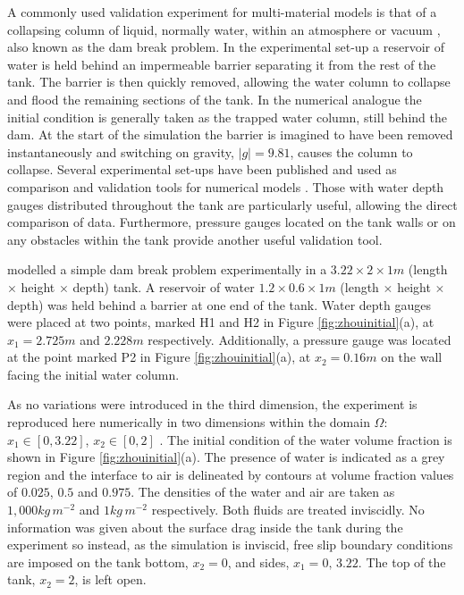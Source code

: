 

A commonly used validation experiment for multi-material models is that of a collapsing column of liquid, normally water, within an atmosphere or vacuum \citep{lakehal_interface_2002}, also known as the dam break problem.  In the experimental set-up a reservoir of water is held behind an impermeable barrier separating it from the rest of the tank.  The barrier is then quickly removed, allowing the water column to collapse and flood the remaining sections of the tank.  In the numerical analogue the initial condition is generally taken as the trapped water column, still behind the dam.  At the start of the simulation the barrier is imagined to have been removed instantaneously and switching on gravity, $|g| = 9.81$, causes the column to collapse.   Several experimental set-ups have been published and used as comparison and validation tools for numerical models \citep{martin_part_1952, greaves_simulation_2006}.  Those with water depth gauges distributed throughout the tank are particularly useful, allowing the direct comparison of data.  Furthermore, pressure gauges located on the tank walls or on any obstacles within the tank provide another useful validation tool.

\citet{zhou_nonlinear_1999} modelled a simple dam break problem experimentally in a $3.22\times2\times1m$ (length $\times$ height $\times$ depth) tank.  A reservoir of water $1.2\times0.6\times1m$ (length $\times$ height $\times$ depth) was held behind a barrier at one end of the tank.  Water depth gauges were placed at two points, marked H1 and H2 in Figure \ref{fig:zhouinitial}(a), at $x_1 = 2.725m$ and $2.228m$ respectively.  Additionally, a pressure gauge was located at the point marked P2 in Figure \ref{fig:zhouinitial}(a), at $x_2=0.16m$ on the wall facing the initial water column.

As no variations were introduced in the third dimension, the experiment is reproduced here numerically in two dimensions within the domain $\Omega$: $x_1 \in [0,3.22]$, $x_2 \in [0,2]$ \citep{lee_numerical_2002, colagrossi_numerical_2003, park_volume-of-fluid_2009}.  The initial condition of the water volume fraction is shown in Figure \ref{fig:zhouinitial}(a).  The presence of water is indicated as a grey region and the interface to air is delineated by contours at volume fraction values of $0.025$, $0.5$ and $0.975$.  The densities of the water and air are taken as $ 1,000kg\,m^{-2}$ and $1kg\,m^{-2}$ respectively.  Both fluids are treated inviscidly.  No information was given about the surface drag inside the tank during the experiment so instead, as the simulation is inviscid, free slip boundary conditions are imposed on the tank bottom, $x_2=0$, and sides, $x_1=0,\,3.22$.  The top of the tank, $x_2=2$, is left open.

